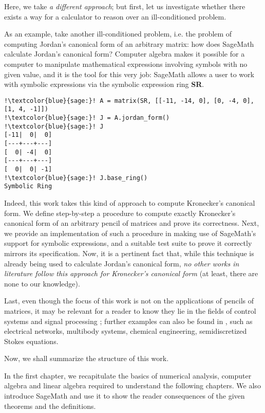 Here, we take \textit{a different approach}; but first, let us investigate whether there exists a way for a
calculator to reason over an ill-conditioned problem.

As an example, take another ill-conditioned problem, i.e. the problem of computing Jordan's canonical form of
an arbitrary matrix: how does SageMath calculate Jordan's canonical form? Computer algebra makes it possible for
a computer to manipulate mathematical expressions involving symbols with no given value, and it is the tool for
this very job: SageMath allows a user to work with symbolic expressions via the symbolic expression ring \textbf{SR}.
\begin{verbatim}
!\textcolor{blue}{sage:}! A = matrix(SR, [[-11, -14, 0], [0, -4, 0], [1, 4, -1]])
!\textcolor{blue}{sage:}! J = A.jordan_form()
!\textcolor{blue}{sage:}! J
[-11|  0|  0]
[---+---+---]
[  0| -4|  0]
[---+---+---]
[  0|  0| -1]
!\textcolor{blue}{sage:}! J.base_ring()
Symbolic Ring
\end{verbatim}

Indeed, this work takes this kind of approach to compute Kronecker's canonical form. We define step-by-step a
procedure to compute exactly Kronecker's canonical form of an arbitrary pencil of matrices and prove its
correctness. Next, we provide an implementation of such a procedure in \cite{trapani-kronecker} making use of
SageMath's support for symbolic expressions, and a suitable test suite to prove it correctly mirrors its
specification. Now, it is a pertinent fact that, while this technique is already being used to calculate
Jordan's canonical form, \textit{no other works in literature follow this approach for Kronecker's canonical form}
(at least, there are none to our knowledge).

Last, even though the focus of this work is not on the applications of pencils of matrices, it may be relevant
for a reader to know they lie in the fields of control
systems \cite{824690, 1103983} and signal processing \cite{1179782}; further examples can also be found in
\cite[pp. 8-11]{kunkel-mehrmann}, such as electrical networks, multibody systems, chemical
engineering, semidiscretized Stokes equations.

\pagebreak

Now, we shall summarize the structure of this work.

In the first chapter, we recapitulate the basics of numerical analysis, computer algebra and linear algebra required to
understand the following chapters. We also introduce SageMath and use it to show the reader consequences of the given
theorems and the definitions.

